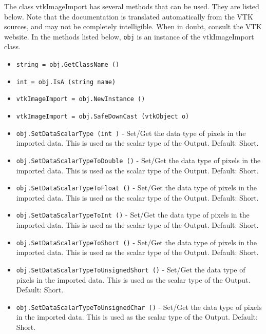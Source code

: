 The class vtkImageImport has several methods that can be used.
  They are listed below.
Note that the documentation is translated automatically from the VTK sources,
and may not be completely intelligible.  When in doubt, consult the VTK website.
In the methods listed below, \verb|obj| is an instance of the vtkImageImport class.
\begin{itemize}
\item  \verb|string = obj.GetClassName ()|

\item  \verb|int = obj.IsA (string name)|

\item  \verb|vtkImageImport = obj.NewInstance ()|

\item  \verb|vtkImageImport = obj.SafeDownCast (vtkObject o)|

\item  \verb|obj.SetDataScalarType (int )| -  Set/Get the data type of pixels in the imported data.  This is used
 as the scalar type of the Output.  Default: Short.

\item  \verb|obj.SetDataScalarTypeToDouble ()| -  Set/Get the data type of pixels in the imported data.  This is used
 as the scalar type of the Output.  Default: Short.

\item  \verb|obj.SetDataScalarTypeToFloat ()| -  Set/Get the data type of pixels in the imported data.  This is used
 as the scalar type of the Output.  Default: Short.

\item  \verb|obj.SetDataScalarTypeToInt ()| -  Set/Get the data type of pixels in the imported data.  This is used
 as the scalar type of the Output.  Default: Short.

\item  \verb|obj.SetDataScalarTypeToShort ()| -  Set/Get the data type of pixels in the imported data.  This is used
 as the scalar type of the Output.  Default: Short.

\item  \verb|obj.SetDataScalarTypeToUnsignedShort ()| -  Set/Get the data type of pixels in the imported data.  This is used
 as the scalar type of the Output.  Default: Short.

\item  \verb|obj.SetDataScalarTypeToUnsignedChar ()| -  Set/Get the data type of pixels in the imported data.  This is used
 as the scalar type of the Output.  Default: Short.


\end{itemize}
